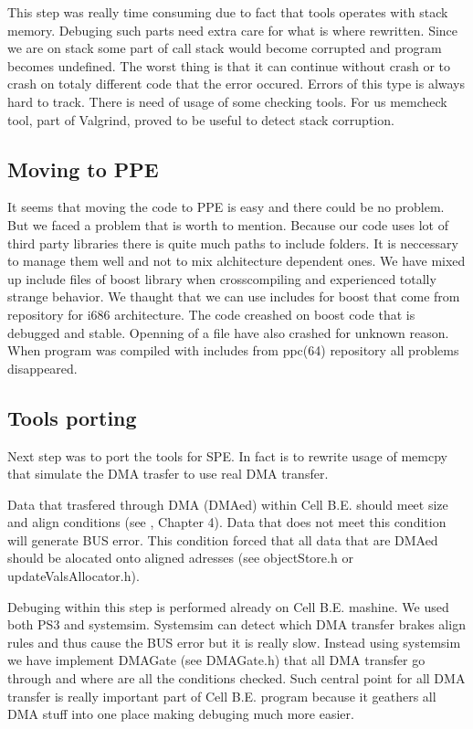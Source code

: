 \par
This step was really time consuming due to fact that tools operates with stack memory.
Debuging such parts need extra care for what is where rewritten.
Since we are on stack some part of call stack would become corrupted and program becomes undefined.
The worst thing is that it can continue without crash or to crash on totaly different code that the error occured.
Errors of this type is always hard to track.
There is need of usage of some checking tools.
For us memcheck tool, part of Valgrind, proved to be useful to detect stack corruption.

\subsection{Moving to PPE}

\par
It seems that moving the code to PPE is easy and there could be no problem.
But we faced a problem that is worth to mention.
Because our code uses lot of third party libraries there is quite much paths to include folders.
It is neccessary to manage them well and not to mix alchitecture dependent ones.
We have mixed up include files of boost library when crosscompiling and experienced totally strange behavior.
We thaught that we can use includes for boost that come from repository for i686 architecture.
The code creashed on boost code that is debugged and stable.
Openning of a file have also crashed for unknown reason.
When program was compiled with includes from ppc(64) repository all problems disappeared.

\subsection{Tools porting}

\par
Next step was to port the tools for SPE.
In fact is to rewrite usage of memcpy that simulate the DMA trasfer to use real DMA transfer.

\par
Data that trasfered through DMA (DMAed) within Cell B.E. should meet size and align conditions (see \cite{programmersGuide}, Chapter 4).
Data that does not meet this condition will generate BUS error.
This condition forced that all data that are DMAed should be alocated onto aligned adresses (see objectStore.h or updateValsAllocator.h).

\par
Debuging within this step is performed already on Cell B.E. mashine.
We used both PS3 and systemsim.
Systemsim can detect which DMA transfer brakes align rules and thus cause the BUS error but it is really slow.
Instead using systemsim we have implement DMAGate (see DMAGate.h) that all DMA transfer go through and where are all the conditions checked.
Such central point for all DMA transfer is really important part of Cell B.E. program because it geathers all DMA stuff into one place making debuging much more easier.
